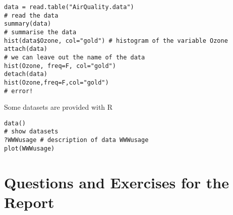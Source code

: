 \documentclass[a4paper,10pt]{article}
\begin{document}
\begin{lstlisting}
data = read.table("AirQuality.data")
# read the data 
summary(data)
# summarise the data 
hist(data$Ozone, col="gold") # histogram of the variable Ozone
attach(data)
# we can leave out the name of the data 
hist(Ozone, freq=F, col="gold")
detach(data)
hist(Ozone,freq=F,col="gold")
# error! 
\end{lstlisting}

\noindent
Some datasets are provided with R

\begin{lstlisting}
data()
# show datasets 
?WWWusage # description of data WWWusage
plot(WWWusage)
\end{lstlisting}

\section{Questions and Exercises for the Report} 
\end{document}
